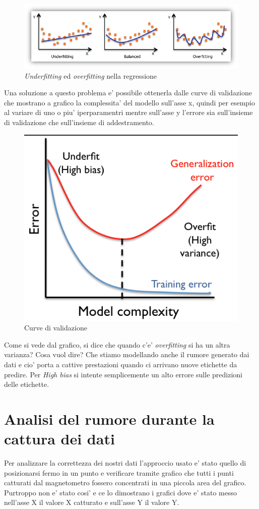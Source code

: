 \begin{figure}[H]
	\centering
	\includegraphics[width=0.7\linewidth]{img/underfittingoverfitting}
	\caption{\textit{Underfitting} ed \textit{overfitting} nella regressione}
	\label{fig:underfittingoverfitting}
\end{figure}

Una soluzione a questo problema e' possibile ottenerla dalle curve di validazione che mostrano a grafico la complessita' del modello sull'asse x, quindi per esempio al variare di uno o piu' iperparamentri mentre sull'asse y l'errore sia sull'insieme di validazione che sull'insieme di addestramento.

\begin{figure}[H]
	\centering
	\includegraphics[width=0.7\linewidth]{img/validation_curve}
	\caption{Curve di validazione}
	\label{fig:validationcurve}
\end{figure}

Come si vede dal grafico, si dice che quando c'e' \textit{overfitting} si ha un altra varianza? Cosa vuol dire? Che stiamo modellando anche il rumore generato dai dati e cio' porta a cattive prestazioni quando ci arrivano nuove etichette da predire. Per \textit{High bias} si intente semplicemente un alto errore sulle predizioni delle etichette.
\section{Analisi del rumore durante la cattura dei dati}
Per analizzare la correttezza dei nostri dati l'approccio usato e' stato quello di posizionarsi fermo in un punto e verificare tramite grafico che tutti i punti catturati dal magnetometro fossero concentrati in una piccola area del grafico. Purtroppo non e' stato cosi' e ce lo dimostrano i grafici dove e' stato messo nell'asse X il valore X catturato e sull'asse Y il valore Y.

